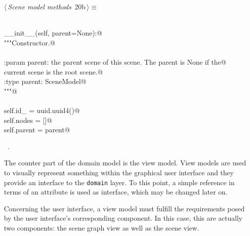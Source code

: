 \documentclass[
    a4paper,      %
    10pt,         %
    openright,    %
    notitlepage,  %
    parskip=half, %
]{scrreprt}       %
\theoremstyle{definition}                    %
\begin{document}
\begin{flushleft} \small
\begin{minipage}{\linewidth}\label{scrap13}\raggedright\small
{} $\langle\,${\itshape Scene model methods}\nobreak\ {\footnotesize {20b}}$\,\rangle\equiv$
\vspace{-1ex}
\begin{list}{}{} \item
\mbox{}\lstinline@@\\
\mbox{}\lstinline@def __init__(self, parent=None):@\\
\mbox{}\lstinline@    """Constructor.@\\
\mbox{}\lstinline@@\\
\mbox{}\lstinline@    :param parent: the parent scene of this scene. The parent is None if the@\\
\mbox{}\lstinline@                   current scene is the root scene.@\\
\mbox{}\lstinline@    :type parent: SceneModel@\\
\mbox{}\lstinline@    """@\\
\mbox{}\lstinline@@\\
\mbox{}\lstinline@    self.id_ = uuid.uuid4()@\\
\mbox{}\lstinline@    self.nodes = []@\\
\mbox{}\lstinline@    self.parent = parent@\\
\mbox{}\lstinline@@{\NWsep}
\end{list}
\vspace{-1.5ex}
\footnotesize
\begin{list}{}{\setlength{\itemsep}{-\parsep}\setlength{\itemindent}{-\leftmargin}}
\item \NWtxtMacroRefIn\ .

\item{}
\end{list}
\end{minipage}\vspace{4ex}
\end{flushleft}
The counter part of the domain model is the view model. View models are used to
visually represent something within the graphical user interface and they
provide an interface to the \verb+domain+ layer. To this point, a simple
reference in terms of an attribute is used as interface, which may be changed
later on.

Concerning the user interface, a view model must fulfill the requirements posed
by the user interface's corresponding component. In this case, this are actually
two components: the scene graph view as well as the scene view.
\end{document}
